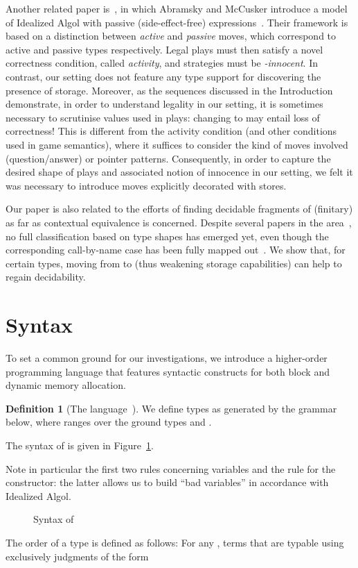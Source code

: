 \documentclass{CSML}
\theoremstyle{definition}\newtheorem{definition}[thm]{Definition}
\theoremstyle{definition}\newtheorem{example}[thm]{Example}
\theoremstyle{definition}\newtheorem{proposition}[thm]{Proposition}
\theoremstyle{definition}\newtheorem{lemma}[thm]{Lemma}
\theoremstyle{definition}\newtheorem{theorem}[thm]{Theorem}
\theoremstyle{definition}\newtheorem{corollary}[thm]{Corollary}
\theoremstyle{definition}\newtheorem{remark}[thm]{Remark}
\newcommand\nt[1]{#1}
\begin{document}
\nt{Another related paper is~\cite{AM99a}, in which Abramsky and McCusker introduce a model of
Idealized Algol with passive (side-effect-free) expressions~\cite{AM99a}.
Their framework is based on a distinction between \emph{active} and \emph{passive} moves, which correspond
to active and passive types respectively. Legal plays must then satisfy a novel correctness condition, called  \emph{activity}, 
and strategies must be \emph{-innocent}. In contrast, our setting does not feature any type support for 
discovering the presence of storage. Moreover, as the sequences discussed in the Introduction demonstrate,
in order to understand legality in our setting, it is sometimes necessary to scrutinise values used in plays:
changing  to  may entail loss of correctness!
This is different from the activity condition (and other conditions used in game semantics), where it suffices
to consider the kind of moves involved (question/answer) or pointer patterns. 
Consequently, in order to capture the desired
shape of plays and associated notion of innocence in our setting,  
we felt it was necessary to  introduce moves explicitly decorated with stores.}

Our paper is also related to the efforts of finding decidable fragments of (finitary)  as far as contextual equivalence is concerned.
Despite several papers in the area~\cite{Ghi01, Mur04b, HMO11,CBHMO15}, no full classification based on type shapes has emerged yet, even though
the corresponding call-by-name case has been fully mapped
out~\cite{MOW05}. We show that, for certain types, moving from 
to  (thus weakening storage capabilities) can help to regain
decidability.



\section{Syntax\label{sec:syntax}}

To set a common ground for our investigations, we introduce a higher-order 
programming language that features syntactic constructs for both
block and dynamic memory allocation. 

\begin{definition}[The language~]
We define types as generated by the grammar below,
where  ranges over the ground types  and .

The syntax of  is given in Figure~\ref{fig:syntax}. 
\end{definition}

Note in particular the first two rules concerning variables and the rule for the  constructor: the latter allows us to build ``bad variables'' in accordance with Idealized Algol. 
\begin{figure}[t]
\renewcommand\arraystretch{2.5}

\caption{Syntax of \label{fig:syntax}}
\makebox[\textwidth][l]{\hrulefill}
\end{figure}
{The order of a type is defined as follows: 
}
For any , 
terms that are typable using exclusively judgments of the
form 
 
\end{document}
